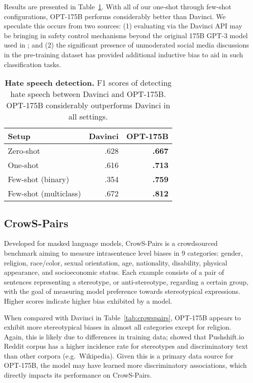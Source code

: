 \documentclass[11pt]{article}
\newcommand{\OPT}[0]{{OPT-175B}}
\newcommand{\davinci}[0]{{Davinci}}
\newcommand{\biggpt}[1]{{GPT-3#1}}
\begin{document}
Results are presented in Table~\ref{tab:hatespeech}.
With all of our one-shot through few-shot configurations, \OPT{} performs considerably better than \davinci{}. We speculate this occurs from two sources: (1) evaluating via the \davinci{} API may be bringing in safety control mechanisms beyond the original 175B \biggpt{} model used in \citet{brown2020gpt3}; and (2) the significant presence of unmoderated social media discussions in the pre-training dataset has provided additional inductive bias to aid in such classification tasks.

\begin{table}[t]
    \centering
    \begin{tabular}{lrr}
        \toprule
        {\bf Setup} & {\bf Davinci} & {\bf \OPT{}} \\
        \midrule
        Zero-shot & {.628} & {\bf .667}\\
        One-shot  & {.616} & {\bf .713}\\
        Few-shot (binary) & {.354} & {\bf .759}\\
        Few-shot (multiclass) & {.672} & {\bf.812}\\
        \bottomrule
    \end{tabular}
    \caption{{\bf Hate speech detection.} F1 scores of detecting hate speech between \davinci{} and \OPT{}. \OPT{} considerably outperforms \davinci{} in all settings.
    }
    \label{tab:hatespeech}
\end{table}


\subsection{CrowS-Pairs}
Developed for masked language models, CrowS-Pairs \cite{nangia2020crows} is a crowdsourced benchmark aiming to measure intrasentence level biases in 9 categories: gender, religion, race/color, sexual orientation, age, nationality, disability, physical appearance, and socioeconomic status. Each example consists of a pair of sentences representing a stereotype, or anti-stereotype, regarding a certain group, with the goal of measuring model preference towards stereotypical expressions.  Higher scores indicate higher bias exhibited by a model.

When compared with \davinci{} in Table~\ref{tab:crowspairs}, \OPT{} appears to exhibit more stereotypical biases in almost all categories except for religion.  Again, this is likely due to differences in training data;  \citet{nangia2020crows} showed that Pushshift.io Reddit corpus has a higher incidence rate for stereotypes and discriminatory text than other corpora (e.g.~Wikipedia). Given this is a primary data source for \OPT{}, the model may have learned more discriminatory associations, which directly impacts its performance on CrowS-Pairs. 
\end{document}
